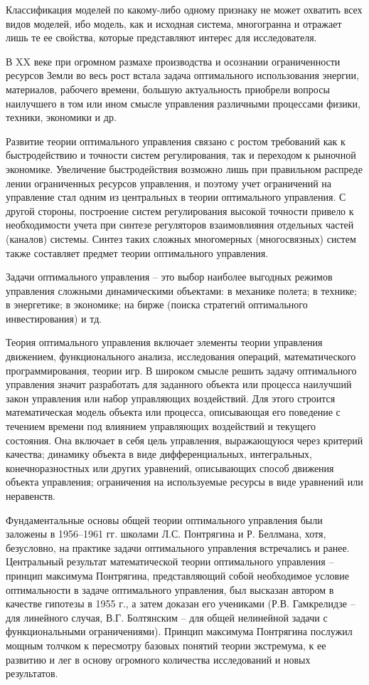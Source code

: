Классификация моделей по какому-либо одному признаку не может охватить всех видов моделей, ибо модель, как и исходная система, многогранна и отражает лишь те ее свойства, которые представляют интерес для исследователя.




В XX веке при огромном размахе производства и осознании ограниченности ресурсов Земли во весь рост встала задача оптимального использования энергии, материалов, рабочего времени, большую актуальность приобрели вопросы наилучшего в том или ином смысле управления различными процессами физики, техники, экономики и др.


 Развитие теории оптимального управления связано с ростом требований как к быстродействию и точности систем регулирования, так и переходом к рыночной экономике. Увеличение быстродействия возможно лишь при правильном распреде лении ограниченных ресурсов управления, и поэтому учет ограничений на управление стал одним из центральных в теории оптимального управления. С другой стороны, построение систем регулирования высокой точности привело к необходимости учета при синтезе регуляторов взаимовлияния отдельных частей (каналов) системы. Синтез таких сложных многомерных (многосвязных) систем также составляет предмет теории оптимального управления.
 
 
Задачи оптимального управления – это выбор наиболее выгодных режимов управления сложными динамическими объектами: в механике полета; в технике; в энергетике; в экономике; на бирже (поиска стратегий оптимального инвестирования) и тд.


Теория оптимального управления включает элементы теории управления движением, функционального анализа, исследования операций, математического программирования, теории игр. В широком смысле решить задачу оптимального управления значит разработать для заданного объекта или процесса наилучший закон управления или набор управляющих воздействий. Для этого строится математическая модель объекта или процесса, описывающая его поведение с течением времени под влиянием управляющих воздействий и текущего состояния. Она включает в себя цель управления, выражающуюся через критерий качества; динамику объекта в виде дифференциальных, интегральных, конечноразностных или других уравнений, описывающих способ движения объекта управления; ограничения на используемые ресурсы в виде уравнений или неравенств.


Фундаментальные основы общей теории оптимального управления были заложены в 1956–1961 гг. школами Л.С. Понтрягина  и Р. Беллмана, хотя, безусловно, на практике задачи оптимального управления встречались и ранее. Центральный результат математической теории оптимального управления – принцип максимума Понтрягина, представляющий собой необходимое условие оптимальности в задаче оптимального управления, был высказан автором в качестве гипотезы в 1955 г., а затем доказан его учениками (Р.В. Гамкрелидзе – для линейного случая, В.Г. Болтянским – для общей нелинейной задачи с функциональными ограничениями). Принцип максимума Понтрягина послужил мощным толчком к пересмотру базовых понятий теории экстремума, к ее развитию и лег в основу огромного количества исследований и новых результатов.


